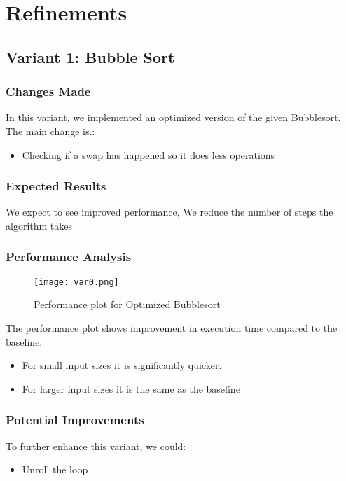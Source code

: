 \documentclass[twocolumn]{article}
\begin{document}
\section{Refinements}

\subsection{Variant 1: Bubble Sort}

\subsubsection{Changes Made}
In this variant, we implemented an optimized version of the given Bubblesort. The main change is.:
\begin{itemize}
    \item Checking if a swap has happened so it does less operations
\end{itemize}

\subsubsection{Expected Results}
We expect to see improved performance, We reduce the number of steps  the algorithm takes

\subsubsection{Performance Analysis}
\begin{figure}[H]
    \centering
    \texttt{[image: var0.png]}
    \caption{Performance plot for Optimized Bubblesort}
    \label{fig:variant1_plot}
\end{figure}

The performance plot shows  improvement in execution time compared to the baseline.
\begin{itemize}
    \item For small input sizes it is significantly quicker.
    \item For larger input sizes it is the same as the baseline
\end{itemize}

\subsubsection{Potential Improvements}
To further enhance this variant, we could:
\begin{itemize}
    \item  Unroll the loop

\end{itemize}
\end{document}
